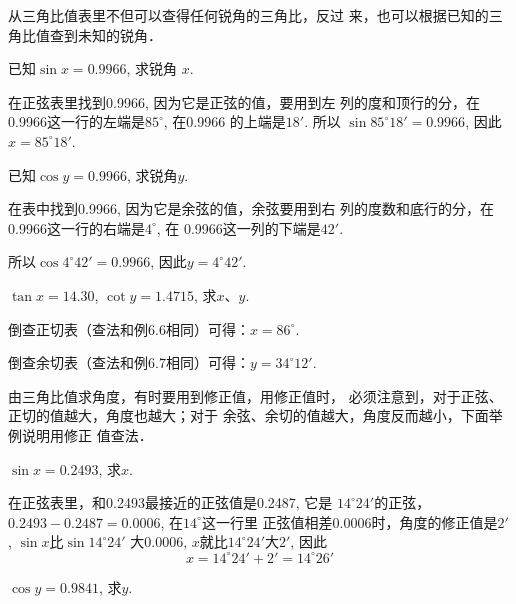 从三角比值表里不但可以查得任何锐角的三角比，反过
来，也可以根据已知的三角比值查到未知的锐角．

\begin{example}
    已知$\sin x=0.9966$, 求锐角
    $x$.
\end{example}

\begin{solution}
    在正弦表里找到0.9966, 因为它是正弦的值，要用到左
    列的度和顶行的分，在0.9966这一行的左端是$85^{\circ}$, 在0.9966
    的上端是$18'$. 所以
   $ \sin85^{\circ}18'=0.9966$, 因此$x=85^{\circ}18'$.
\end{solution}

\begin{example}
已知$\cos y=0.9966$, 求锐角$y$.
\end{example}

\begin{solution}   
    在表中找到0.9966, 因为它是余弦的值，余弦要用到右
    列的度数和底行的分，在0.9966这一行的右端是$4^{\circ}$, 在
    0.9966这一列的下端是$42'$.

    所以$\cos4^{\circ}42'=0.9966$, 因此$y=4^{\circ}42'$.
\end{solution}

\begin{example}
   $\tan x=14.30$, $\cot y=1.4715$, 求$x$、$y$. 
\end{example}

\begin{solution}
    倒查正切表（查法和例6.6相同）可得：$x=86^{\circ}$.

倒查余切表（查法和例6.7相同）可得：$y=34^{\circ}12'$.
\end{solution}

由三角比值求角度，有时要用到修正值，用修正值时，
必须注意到，对于正弦、正切的值越大，角度也越大；对于
余弦、余切的值越大，角度反而越小，下面举例说明用修正
值查法．

\begin{example}
      $\sin x=0.2493$, 求$x$.
\end{example}

\begin{solution}
在正弦表里，和0.2493最接近的正弦值是0.2487, 它是
$14^{\circ}24'$的正弦，$0.2493-0.2487=0.0006$, 在$14^{\circ}$这一行里
正弦值相差0.0006时，角度的修正值是$2'$, $\sin x$比$\sin14^{\circ}24'$
大0.0006, $x$就比$14^{\circ}24'$大$2'$, 因此
\[x=14^{\circ}24'+2'=14^{\circ}26'\]
\end{solution}

\begin{example}
    $\cos y=0.9841$, 求$y$.
\end{example}

